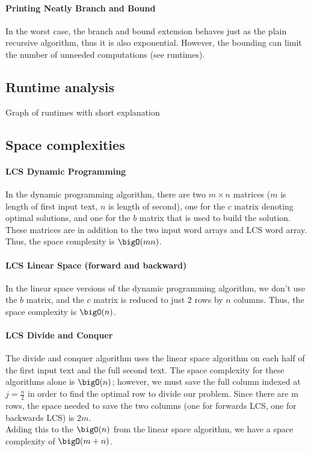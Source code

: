 	\paragraph{Printing Neatly Branch and Bound}
		In the worst case, the branch and bound extension behaves just as the plain recursive algorithm, thus it is also exponential. However, the bounding can limit the number of unneeded computations (see runtimes).



\subsection{Runtime analysis}
	Graph of runtimes with short explanation



\subsection{Space complexities}
	\paragraph{LCS Dynamic Programming }
		In the dynamic programming algorithm, there are two $m \times n$ matrices ($m$ is length of first input text, $n$ is length of second), one for the $c$ matrix denoting optimal solutions, and one for the $b$ matrix that is used to build the solution. \\
		These matrices are in addition to the two input word arrays and LCS word array. Thus, the space complexity is $\bigO(mn)$.

	\paragraph{LCS Linear Space (forward and backward)}
		In the linear space versions of the dynamic programming algorithm, we don't use the $b$ matrix, and the $c$ matrix is reduced to just 2 rows by $n$ columns. Thus, the space complexity is $\bigO(n)$.

	\paragraph{LCS Divide and Conquer}
		The divide and conquer algorithm uses the linear space algorithm on each half of the first input text and the full second text. The space complexity for these algorithms alone is $\bigO(n)$; 
		however, we must save the full column indexed at $j = \frac{n}{2}$ in order to find the optimal row to divide our problem. Since there are m rows, the space needed to save the two columns (one for forwards LCS, one for backwards LCS) is $2m$. \\
		Adding this to the $\bigO(n)$ from the linear space algorithm, we have a space complexity of $\bigO(m+n)$.

